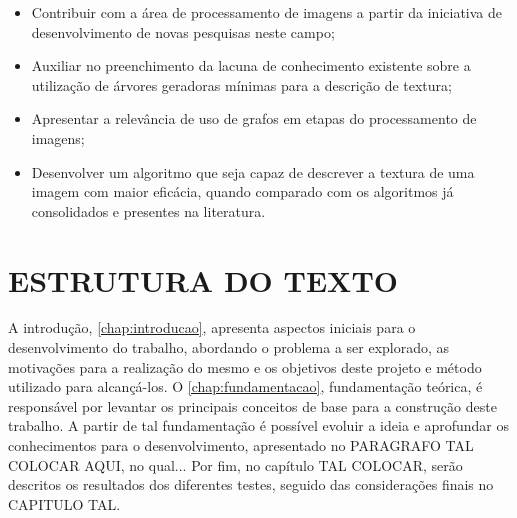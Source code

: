 \begin{itemize}
    \item Contribuir com a área de processamento de imagens a partir da iniciativa de desenvolvimento de novas pesquisas neste campo;
    \item Auxiliar no preenchimento da lacuna de conhecimento existente sobre a utilização de árvores geradoras mínimas para a descrição de textura;
    \item Apresentar a relevância de uso de grafos em etapas do processamento de imagens;
    \item Desenvolver um algoritmo que seja capaz de descrever a textura de uma imagem com maior eficácia, quando comparado com os algoritmos já consolidados e presentes na literatura.
\end{itemize}

\begin{comment}
\par No tópico a seguir serão abordados em mais detalhes as etapas percorridas para tal implementação, bem como o posterior esclarecimento da divisão do trabalho escrito.
\end{comment}

\section{ESTRUTURA DO TEXTO}
\label{sec:organizacaodoc}

\par A introdução, \autoref{chap:introducao}, apresenta aspectos iniciais para o desenvolvimento do trabalho, abordando o problema a ser explorado, as motivações para a realização do mesmo e os objetivos deste projeto e método utilizado para alcançá-los. O \autoref{chap:fundamentacao}, fundamentação teórica, é responsável por levantar os principais conceitos de base para a construção deste trabalho. A partir de tal fundamentação é possível evoluir a ideia e aprofundar os conhecimentos para o desenvolvimento, apresentado no PARAGRAFO TAL COLOCAR AQUI, no qual... Por fim, no capítulo TAL COLOCAR, serão descritos os resultados dos diferentes testes, seguido das considerações finais no CAPITULO TAL.
